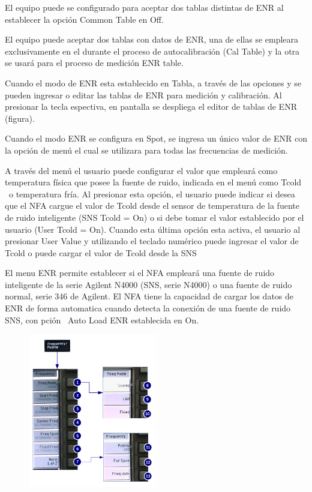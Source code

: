 {\begin{minipage}[t]{\textwidth}
		El equipo puede se configurado para aceptar dos tablas distintas de ENR al establecer la opción Common Table en Off. 
		
		El equipo puede aceptar dos tablas con datos de ENR, una de ellas se empleara exclusivamente en el durante el proceso de autocalibración (Cal Table) y la otra se usará para el proceso de medición ENR table.
		
		Cuando el modo de ENR esta establecido en Tabla, a través de las opciones y se pueden ingresar o editar las tablas de ENR para medición y calibración. Al presionar la tecla  espectiva, en pantalla se despliega el editor de tablas de ENR (figura). 	
		
		Cuando el modo ENR se configura en Spot, se ingresa un único valor de ENR con la opción de
		menú el cual se utilizara para todas las frecuencias de medición.
		
		A través del menú el usuario puede configurar el valor que empleará como temperatura física que posee la fuente de ruido, indicada en el menú como Tcold \ o temperatura fría. Al presionar esta opción, el usuario puede indicar si desea que el NFA cargue el valor de Tcold desde el sensor de temperatura de la fuente de ruido inteligente (SNS Tcold = On) o si debe tomar el valor establecido por el usuario (User Tcold = On). Cuando esta última opción esta activa, el usuario al presionar User Value y utilizando el teclado numérico puede ingresar el valor de Tcold o puede cargar el valor de Tcold desde la SNS
		
		El menu ENR permite establecer si el NFA empleará una fuente de ruido inteligente de la serie Agilent N4000 (SNS, serie N4000) o una fuente de ruido normal, serie 346 de Agilent. El NFA tiene la capacidad de cargar los datos de ENR de forma automatica cuando detecta	la conexión de una fuente de ruido SNS, con pción \ Auto Load ENR establecida en On.
	\end{minipage}
	
	\newpage		
	
	\begin{minipage}[t]{\textwidth}	
		\begin{figure}	
			\centering	
			\includegraphics[width=0.5\textwidth]{Imagenes/MenuFrequencyPointsN8975A.pdf}	
		\end{figure}	
		

\end{minipage}}
